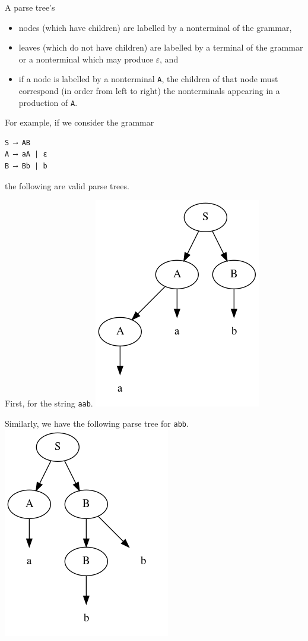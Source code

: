 \documentclass[11pt]{article}
\theoremstyle{definition}
\begin{document}
A parse tree's
\begin{itemize}
\item nodes (which have children) are
labelled by a nonterminal of the grammar,
\item leaves (which do not have children) are
labelled by a terminal of the grammar
or a nonterminal which may produce \(ε\), and
\item if a node is labelled by a nonterminal \texttt{A},
the children of that node must correspond
(in order from left to right)
the nonterminals appearing in a production of \texttt{A}.
\end{itemize}

For example, if we consider the grammar
\begin{verbatim}
S ⟶ AB
A ⟶ aA | ε
B ⟶ Bb | b
\end{verbatim}
the following are valid parse trees.

First, for the string \texttt{aab}.
\includegraphics{media/parse-tree-example-aab.png}

Similarly, we have the following parse tree for \texttt{abb}.
\includegraphics{media/parse-tree-example-abb.png}
\end{document}
